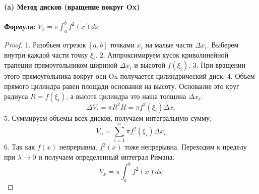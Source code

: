 \paragraph{(a) Метод дисков (вращение вокруг Ox)}
\begin{center}
\end{center}

\textbf{Формула:} $V_x = \pi \int_a^b f^2(x) dx$

\begin{proof}
1. Разобьем отрезок $[a, b]$ точками $x_i$ на малые части $\Delta x_i$. Выберем внутри каждой части точку $\xi_i$.
2. Аппроксимируем кусок криволинейной трапеции прямоугольником шириной $\Delta x_i$ и высотой $f(\xi_i)$.
3. При вращении этого прямоугольника вокруг оси Ox получается цилиндрический диск.
4. Объем прямого цилиндра равен площади основания на высоту. Основание это круг радиуса $R = f(\xi_i)$, а высота цилиндра это наша толщина $\Delta x_i$.
$$\Delta V_i = \pi R^2 H = \pi f^2(\xi_i) \Delta x_i$$
5. Суммируем объемы всех дисков, получаем интегральную сумму:
$$V_n = \sum_{i=1}^n \pi f^2(\xi_i) \Delta x_i$$
6. Так как $f(x)$ непрерывна, $f^2(x)$ тоже непрерывна. Переходим к пределу при $\lambda \to 0$ и получаем определенный интеграл Римана:
$$V_x = \pi \int_a^b f^2(x) dx$$
\end{proof}

